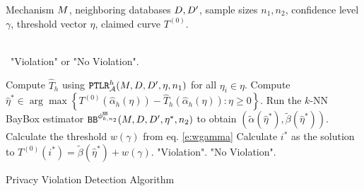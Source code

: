 \begin{algorithm}[h]
\footnotesize
\algorithmicrequire \; \parbox[t]{\dimexpr0.9\linewidth-\algorithmicindent}{Mechanism $M$, neighboring databases $D, D'$, sample sizes $n_1, n_2$, confidence level $\gamma$, threshold vector $\eta$, claimed curve $T^{(0)}$.}\\[0.1cm]
\algorithmicensure \, "Violation" or "No Violation".
\begin{algorithmic}[1]
        \State Compute $\hat{T}_h$ using $\mathtt{PTLR}^{h}_{\mathcal{A}}(M, D, D', \eta,n_1)$ for all $\eta_i \in \eta$.
        \State Compute $\hat{\eta}^* \in \arg\max \left\{T^{(0)}(\hat{\alpha}_h(\eta)) - \hat{T}_h(\hat{\alpha}_h(\eta)) : \eta \ge 0\right\}$.
        \State Run the $k$-NN BayBox estimator $\mathtt{BB}^{\phi^{\mathtt{NN}}_{k, n_2}}(M, D, D', \eta^*,n_2)$ to obtain $(\tilde{\alpha}(\hat{\eta}^*), \tilde{\beta}(\hat{\eta}^*))$.
        \State Calculate the threshold $w(\gamma)$ from eq. \eqref{e:wgamma}
        \State Calculate $i^*$ as the solution to $T^{(0)}(i^*) = \tilde{\beta}(\hat{\eta}^*) + w(\gamma)$.
          \State \Return "Violation".
        \Else
           \State \Return  "No Violation".
        \EndIf
    \EndFunction
\end{algorithmic}
\caption{Privacy Violation Detection Algorithm}\label{alg:auditor}
\label{auditor}
\end{algorithm}



